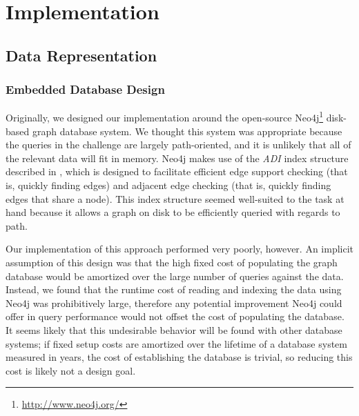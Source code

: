 \documentclass{article}
\begin{document}

\section{Implementation}
\subsection{Data Representation}
\subsubsection{Embedded Database Design}
Originally, we designed our implementation around the open-source
Neo4j\footnote{\url{http://www.neo4j.org/}} disk-based graph database
system.  We thought this system was appropriate because the queries in
the challenge are largely path-oriented, and it is unlikely that all
of the relevant data will fit in memory.  Neo4j makes use of the
\emph{ADI} index structure \cite[Chapter~6]{IanRobinson:2013ul}
described in \cite{wang2004scalable}, which is designed to facilitate
efficient edge support checking (that is, quickly finding edges) and
adjacent edge checking (that is, quickly finding edges that share a
node).  This index structure seemed well-suited to the task at hand
because it allows a graph on disk to be efficiently queried with
regards to path.

Our implementation of this approach performed very poorly, however.
An implicit assumption of this design was that the high fixed cost of
populating the graph database would be amortized over the large number
of queries against the data.  Instead, we found that the runtime cost 
of reading and indexing the data using Neo4j was prohibitively large,
therefore any potential improvement Neo4j could offer in query performance
would not offset the cost of populating the database.
It seems likely that this undesirable behavior will be found
with other database systems; if fixed setup costs are amortized over
the lifetime of a database system measured in years, the cost of
establishing the database is trivial, so reducing this cost is likely
not a design goal.
\end{document}
